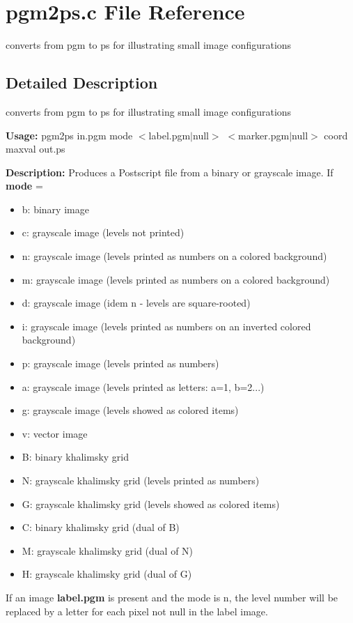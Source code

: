 \section{pgm2ps.c File Reference}
\label{pgm2ps_8c}
converts from pgm to ps for illustrating small image configurations 



\subsection{Detailed Description}
converts from pgm to ps for illustrating small image configurations 

{\bf Usage:} pgm2ps in.pgm mode $<$label.pgm$|$null$>$ $<$marker.pgm$|$null$>$ coord maxval out.ps

{\bf Description:} Produces a Postscript file from a binary or grayscale image. If {\bf mode} = \begin{itemize}
\item b: binary image \item c: grayscale image (levels not printed) \item n: grayscale image (levels printed as numbers on a colored background) \item m: grayscale image (levels printed as numbers on a colored background) \item d: grayscale image (idem n - levels are square-rooted) \item i: grayscale image (levels printed as numbers on an inverted colored background) \item p: grayscale image (levels printed as numbers) \item a: grayscale image (levels printed as letters: a=1, b=2...) \item g: grayscale image (levels showed as colored items) \item v: vector image \item B: binary khalimsky grid \item N: grayscale khalimsky grid (levels printed as numbers) \item G: grayscale khalimsky grid (levels showed as colored items) \item C: binary khalimsky grid (dual of B) \item M: grayscale khalimsky grid (dual of N) \item H: grayscale khalimsky grid (dual of G)\end{itemize}
If an image {\bf label.pgm} is present and the mode is n, the level number will be replaced by a letter for each pixel not null in the label image.

